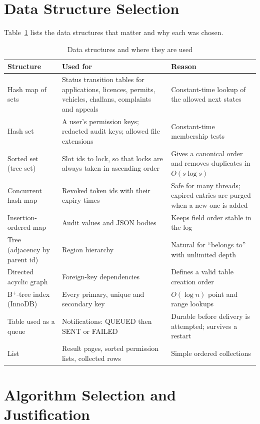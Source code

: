 \section{Data Structure Selection}
Table~\ref{tab:ds} lists the data structures that matter and why each was chosen.

\begin{table}[H]
\centering\small
\caption{Data structures and where they are used}\label{tab:ds}
\begin{tabularx}{\linewidth}{@{}p{3.1cm}p{4.3cm}X@{}}
\toprule \textbf{Structure} & \textbf{Used for} & \textbf{Reason}\\ \midrule
Hash map of sets & Status transition tables for applications, licences, permits, vehicles, challans, complaints and appeals & Constant-time lookup of the allowed next states\\
Hash set & A user's permission keys; redacted audit keys; allowed file extensions & Constant-time membership tests\\
Sorted set (tree set) & Slot ids to lock, so that locks are always taken in ascending order & Gives a canonical order and removes duplicates in $O(s\log s)$\\
Concurrent hash map & Revoked token ids with their expiry times & Safe for many threads; expired entries are purged when a new one is added\\
Insertion-ordered map & Audit values and JSON bodies & Keeps field order stable in the log\\
Tree (adjacency by parent id) & Region hierarchy & Natural for ``belongs to'' with unlimited depth\\
Directed acyclic graph & Foreign-key dependencies & Defines a valid table creation order\\
B$^+$-tree index (InnoDB) & Every primary, unique and secondary key & $O(\log n)$ point and range lookups\\
Table used as a queue & Notifications: QUEUED then SENT or FAILED & Durable before delivery is attempted; survives a restart\\
List & Result pages, sorted permission lists, collected rows & Simple ordered collections\\
\bottomrule
\end{tabularx}
\end{table}

\section{Algorithm Selection and Justification}
